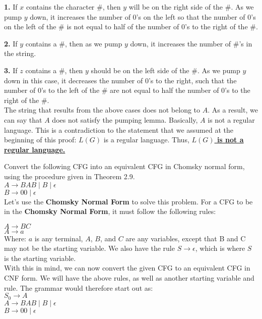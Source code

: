 \documentclass[12pt]{article}
\begin{document}
\textbf{1.} If $x$ contains the character \#, then $y$ will be on the right side of the \#.
As we pump $y$ down, it increases the number of 0's on the left so that the number of
0's on the left of the \# is not equal to half of the number of 0's to the right of the \#.

\textbf{2.} If $y$ contains a \#, then as we pump $y$ down, it increases the number of \#'s in the string.

\textbf{3.} If $z$ contains a \#, then $y$ should be on the left side of the \#. As we pump $y$ down in this
case, it decreases the number of 0's to the right, such that the number of 0's to the left of the \#
are not equal to half the number of 0's to the right of the \#. \\

The string that results from the above cases does not belong to $A$. As a result, we can say that
$A$ does not satisfy the pumping lemma. Basically, $A$ is not a regular language. This is a
contradiction to the statement that we assumed at the beginning of this proof:
$L(G)$ is a regular language. Thus, \underline{\textbf{$L(G)$ is not a regular language.}}

 Convert the following CFG into an equivalent CFG in Chomsky normal form,
using the procedure given in Theorem 2.9. \\

$A \rightarrow BAB \; | \; B \; | \; \epsilon $ \\
$B \rightarrow 00 \; | \; \epsilon $ \\

Let's use the \textbf{Chomsky Normal Form} to solve this problem. For a CFG to be in
the \textbf{Chomsky Normal Form}, it must follow the following rules:

$A \rightarrow BC$ \\
$A \rightarrow a$  \\

Where: $a$ is any terminal, $A$, $B$, and $C$ are any variables, except that B and C may not be the starting variable.
We also have the rule $S \rightarrow \epsilon$, which is where $S$ is the starting variable. \\

With this in mind, we can now convert the given CFG to an equivalent CFG in CNF form.
We will have the above rules, as well as another starting variable and rule. The grammar
would therefore start out as: \\
$S_0 \rightarrow A$ \\
$A \rightarrow BAB \; | \; B \; | \; \epsilon $ \\
$B \rightarrow 00 \; | \; \epsilon $ \\
\end{document}
